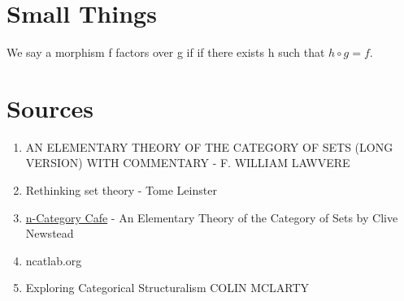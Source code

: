 \begin{appendix}

\section{Small Things}

\begin{remark}
We say a morphism f factors over g if if there exists h such that $h \circ g = f$.
\end{remark}


\section{Sources}

\begin{enumerate}
\item AN ELEMENTARY THEORY
OF THE CATEGORY OF SETS (LONG VERSION)
WITH COMMENTARY - F. WILLIAM LAWVERE
\item Rethinking set theory - Tome Leinster
\item \href{https://golem.ph.utexas.edu/category/2014/01/an_elementary_theory_of_the_ca.html}{n-Category Cafe} - An Elementary Theory of the Category of Sets by Clive Newstead
\item ncatlab.org
\item Exploring Categorical Structuralism
COLIN MCLARTY
\end{enumerate}

\end{appendix}


